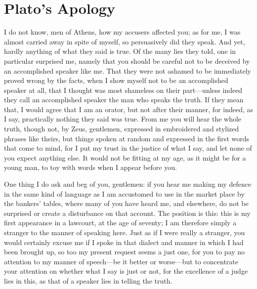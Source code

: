 \chapter{Plato's Apology}
I do not know, men of Athens, how my
accusers affected you; as for me, I was almost
carried away in spite of myself, so persuasively
did they speak. And yet, hardly anything of
what they said is true. Of the many lies they
told, one in particular surprised me, namely
that you should be careful not to be deceived
by an accomplished speaker like me. That they
were not ashamed to be immediately proved
wrong by the facts, when I show myself not to
be an accomplished speaker at all, that I
thought was most shameless on their
part—unless indeed they call an accomplished
speaker the man who speaks the truth. If they
mean that, I would agree that I am an orator,
but not after their manner, for indeed, as I say, practically nothing they said was true. From me you
will hear the whole truth, though not, by Zeus, gentlemen, expressed in embroidered and stylized
phrases like theirs, but things spoken at random and expressed in the first words that come to mind,
for I put my trust in the justice of what I say, and let none of you expect anything else. It would
not be fitting at my age, as it might be for a young man, to toy with words when I appear before
you.

One thing I do ask and beg of you, gentlemen: if you hear me making my defence in the same
kind of language as I am accustomed to use in the market place by the bankers' tables, where many
of you have heard me, and elsewhere, do not be surprised or create a disturbance on that account.
The position is this: this is my first appearance in a lawcourt, at the age of seventy; I am therefore
simply a stranger to the manner of speaking here. Just as if I were really a stranger, you would
certainly excuse me if I spoke in that dialect and manner in which I had been brought up, so too
my present request seems a just one, for you to pay no attention to my manner of speech—be it
better or worse—but to concentrate your attention on whether what I say is just or not, for the
excellence of a judge lies in this, as that of a speaker lies in telling the truth.


